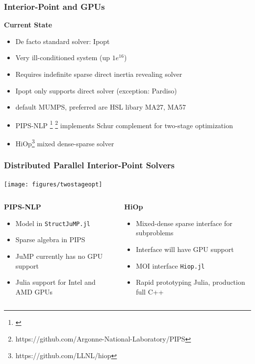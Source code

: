 \begin{frame}[fragile]
  \frametitle{Interior-Point and GPUs}
  {\bf Current State}
  \begin{itemize}
    \item De facto standard solver: Ipopt
    \item Very ill-conditioned system (up $1e^{16}$)
    \item Requires indefinite sparse direct inertia revealing solver
    \item Ipopt only supports direct solver (exception: Pardiso)
    \item default MUMPS, preferred are HSL libary MA27, MA57 
    \item PIPS-NLP \footnote{\cite{pips}} \footnote{https://github.com/Argonne-National-Laboratory/PIPS} implements Schur complement for two-stage optimization
    \item HiOp\footnote{https://github.com/LLNL/hiop} mixed dense-sparse solver 
  \end{itemize}
\end{frame}
\begin{frame}
  \frametitle{Distributed Parallel Interior-Point Solvers}
  \begin{center}
    \texttt{[image: figures/twostageopt]}
  \end{center}
  \begin{columns}[T]
    \begin{column}{0.45\textwidth}
      {\bf PIPS-NLP}
      \begin{itemize}
        \item Model in \lstinline{StructJuMP.jl}
        \item Sparse algebra in PIPS
        \item JuMP currently has no GPU support
        \item Julia support for Intel and AMD GPUs
      \end{itemize}
    \end{column}
    \begin{column}{0.45\textwidth}
      {\bf HiOp}
      \begin{itemize}
        \item Mixed-dense sparse interface for subproblems
        \item Interface will have GPU support
        \item MOI interface \lstinline{Hiop.jl}
        \item Rapid prototyping Julia, production full C++
      \end{itemize}
    \end{column}
  \end{columns}

  
\end{frame}


